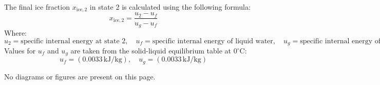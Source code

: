 The final ice fraction \( x_{\text{ice},2} \) in state 2 is calculated using the following formula:  
\[
x_{\text{ice},2} = \frac{u_2 - u_f}{u_g - u_f}
\]  
Where:  
\[
u_2 = \text{specific internal energy at state 2}, \quad u_f = \text{specific internal energy of liquid water}, \quad u_g = \text{specific internal energy of ice}
\]  
Values for \( u_f \) and \( u_g \) are taken from the solid-liquid equilibrium table at \( 0^\circ\text{C} \):  
\[
u_f = (0.0033 \, \text{kJ/kg}), \quad u_g = (0.0033 \, \text{kJ/kg})
\]  

No diagrams or figures are present on this page.